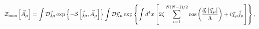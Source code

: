 \begin{equation}
\label{interm}
{\cal Z}_{\rm mon}\left[\vec A_\mu\right]=\int {\cal D}\vec j_\mu\exp\left\{-{\cal S}
\left[\vec j_\mu, \vec A_\mu\right]\right\}\int{\cal D}\vec\chi_\mu
\exp\left\{\int d^4x\left[2\zeta\sum\limits_{i=1}^{N(N-1)/2}
\cos\left(\frac{\vec q_i\left|\vec\chi_\mu\right|}{\Lambda}\right)+i\vec\chi_\mu\vec j_\mu\right]\right\},
\end{equation}

